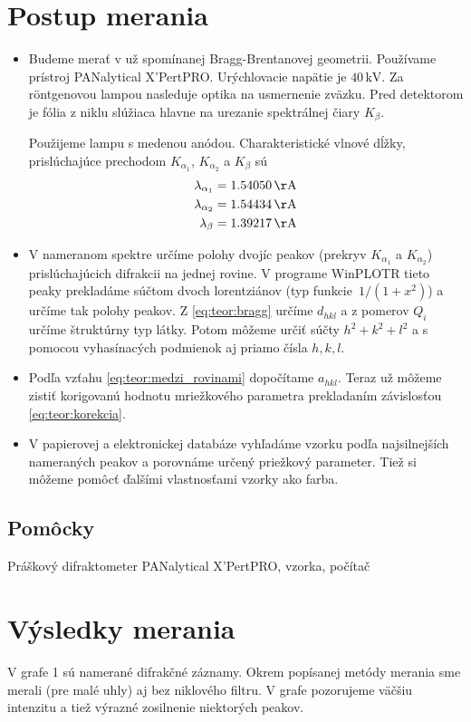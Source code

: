 \documentclass[a4paper, 10pt]{article}
\newcommand{\unit}[1]{\ensuremath{\, \mathrm{#1}}}
\begin{document}
\section*{Postup merania}
\begin{itemize}
\item Budeme merať v už spomínanej Bragg-Brentanovej geometrii. Používame prístroj \mbox{PANalytical} \mbox{X'PertPRO}. Urýchlovacie napätie je $40 \unit{kV}$. Za r\"ontgenovou lampou nasleduje optika na usmernenie zväzku. Pred detektorom je fólia z niklu slúžiaca hlavne na urezanie spektrálnej čiary $K_\beta$. 

Použijeme lampu s medenou anódou. Charakteristické vlnové dĺžky, prislúchajúce prechodom $K_{\alpha_1}$, $K_{\alpha_2}$ a $K_{\beta}$ sú
\begin{align*}
\lambda_{\alpha_1} &= 1.54050 \,\mathrm{\AA} \\
\lambda_{\alpha_2} &= 1.54434 \,\mathrm{\AA} \\
\lambda_{\beta} &= 1.39217 \,\mathrm{\AA}
\end{align*}

\item V nameranom spektre určíme polohy dvojíc peakov (prekryv $K_{\alpha_1}$ a $K_{\alpha_2}$) prislúchajúcich difrakcii na jednej rovine. V programe WinPLOTR tieto peaky prekladáme súčtom dvoch lorentziánov (typ funkcie~$1/(1+x^2)$) a určíme tak polohy peakov. Z \ref{eq:teor:bragg} určíme $d_{hkl}$ a z pomerov $Q_i$ určíme štruktúrny typ látky. Potom môžeme určiť súčty $h^2 + k^2 + l^2$ a s pomocou vyhasínacých podmienok aj priamo čísla $h, k, l$. 
\item Podľa vzťahu \ref{eq:teor:medzi_rovinami} dopočítame $a_{hkl}$. Teraz už môžeme zistiť korigovanú hodnotu mriežkového parametra prekladaním závislosťou \ref{eq:teor:korekcia}.
\item V papierovej a elektronickej databáze vyhľadáme vzorku podľa najsilnejších nameraných peakov a porovnáme určený priežkový parameter. Tiež si môžeme pomôcť ďalšími vlastnosťami vzorky ako farba.
\end{itemize}

\subsection*{Pomôcky}
Práškový difraktometer PANalytical X'PertPRO, vzorka, počítač
\section*{Výsledky merania}
V grafe 1 sú namerané difrakčné záznamy. Okrem popísanej metódy merania sme merali (pre malé uhly) aj bez niklového filtru. V grafe pozorujeme väčšiu intenzitu a tiež výrazné zosilnenie niektorých peakov.
\end{document}
